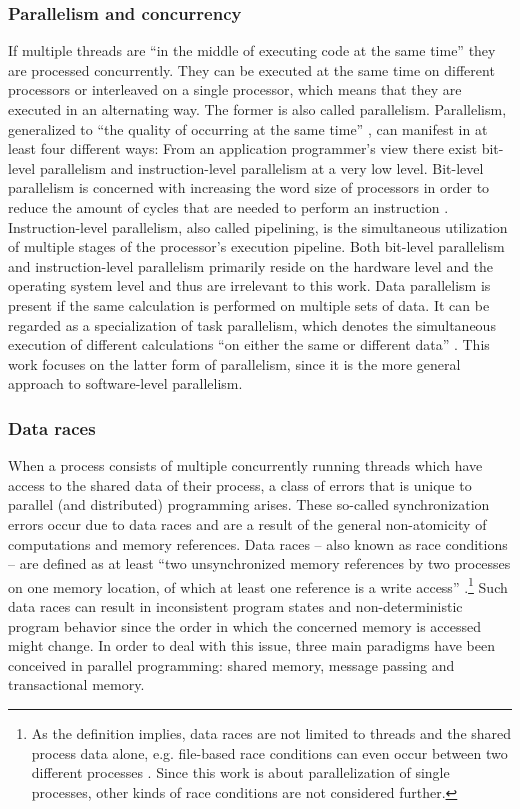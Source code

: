 \subsubsection{Parallelism and concurrency}
If multiple threads are ``in the middle of executing code at the same time'' \cite[p.~124(?)]{MultiProgWithJavaTech} they are processed concurrently. They can be executed at the same time on different processors or interleaved on a single processor, which means that they are executed in an alternating way. The former is also called parallelism. Parallelism, generalized to ``the quality of occurring at the same time'' \cite[p.~91]{OSs_AConceptBasedApproach}, can manifest in at least four different ways: From an application programmer's view there exist bit-level parallelism and instruction-level parallelism at a very low level. Bit-level parallelism is concerned with increasing the word size of processors in order to reduce the amount of cycles that are needed to perform an instruction \cite[p.~15]{ParCompArchitecture_HW/SW_Approach}. Instruction-level parallelism, also called pipelining, is the simultaneous utilization of multiple stages of the processor's execution pipeline. Both bit-level parallelism and instruction-level parallelism primarily reside on the hardware level and the operating system level and thus are irrelevant to this work. Data parallelism is present if the same calculation is performed on multiple sets of data. It can be regarded as a specialization of task parallelism, which denotes the simultaneous execution of different calculations ``on either the same or different data'' \cite[p.~125]{ParCompArchitecture_HW/SW_Approach}. This work focuses on the latter form of parallelism, since it is the more general approach to software-level parallelism.

\subsubsection{Data races}
When a process consists of multiple concurrently running threads which have access to the shared data of their process, a class of errors that is unique to parallel (and distributed) programming arises. These so-called synchronization errors occur due to data races and are a result of the general non-atomicity of computations and memory references. Data races -- also known as race conditions -- are defined as at least ``two unsynchronized memory references by two processes on one memory location, of which at least one reference is a write access'' \cite[p.~327]{ParallelComputing}.\footnote{As the definition implies, data races are not limited to threads and the shared process data alone, e.g. file-based race conditions can even occur between two different processes \cite{OfficialISC2Guide}. Since this work is about parallelization of single processes, other kinds of race conditions are not considered further.} Such data races can result in inconsistent program states and non-deterministic program behavior since the order in which the concerned memory is accessed might change. In order to deal with this issue, three main paradigms have been conceived in parallel programming: shared memory, message passing and transactional memory.


